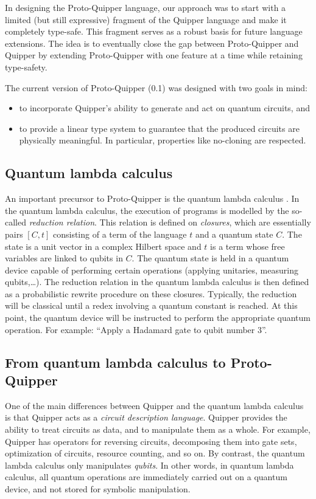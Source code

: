 \documentclass[twoside]{article}
\begin{document}
In designing the Proto-Quipper language, our approach was to start
with a limited (but still expressive) fragment of the Quipper language
and make it completely type-safe.  This fragment serves as a robust
basis for future language extensions. The idea is to eventually close
the gap between Proto-Quipper and Quipper by extending Proto-Quipper
with one feature at a time while retaining type-safety. 

The current version of Proto-Quipper (0.1) was designed with two goals
in mind:
\begin{itemize}
  \item to incorporate Quipper's ability to generate and act on 
  quantum circuits, and 
\item to provide a linear type system to guarantee that the produced
  circuits are physically meaningful. In particular, properties like
  no-cloning are respected.
\end{itemize}

\subsection{Quantum lambda calculus}

An important precursor to Proto-Quipper is the quantum lambda calculus
{\cite{SeVa09}}. In the quantum lambda calculus, the execution of
programs is modelled by the so-called {\em reduction relation}. This
relation is defined on \emph{closures}, which are essentially pairs
$[C,t]$ consisting of a term of the language $t$ and a quantum state
$C$. The state is a unit vector in a complex Hilbert space and $t$ is
a term whose free variables are linked to qubits in $C$. The quantum
state is held in a quantum device capable of performing certain
operations (applying unitaries, measuring qubits,\ldots). The
reduction relation in the quantum lambda calculus is then defined as a
probabilistic rewrite procedure on these closures. Typically, the
reduction will be classical until a redex involving a quantum constant
is reached. At this point, the quantum device will be instructed to
perform the appropriate quantum operation. For example: ``Apply a
Hadamard gate to qubit number 3''.

\subsection{From quantum lambda calculus to Proto-Quipper}

One of the main differences between Quipper and the quantum lambda
calculus is that Quipper acts as a {\em circuit description language}.
Quipper provides the ability to treat circuits as data, and to
manipulate them as a whole.  For example, Quipper has operators for
reversing circuits, decomposing them into gate sets, optimization of
circuits, resource counting, and so on. By contrast, the quantum
lambda calculus only manipulates {\em qubits}. In other words, in
quantum lambda calculus, all quantum operations are immediately
carried out on a quantum device, and not stored for symbolic
manipulation.
\end{document}
